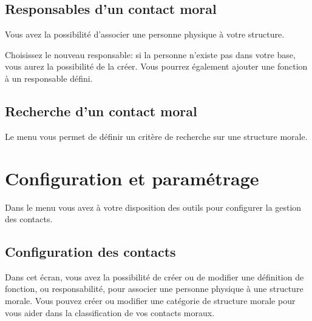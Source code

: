 \documentclass[a4paper,10pt,oneside,french]{sphinxmanual}
\begin{document}
\noindent{}


\subsection{Responsables d’un contact moral}
\label{\detokenize{contacts/legal_entity:responsables-d-un-contact-moral}}
Vous avez la possibilité d’associer une personne physique à votre structure.

Choisissez le nouveau responsable: si la personne n’existe pas dans votre base, vous aurez la possibilité de la créer. Vous pourrez également ajouter une fonction à un responsable défini.

\noindent{}


\subsection{Recherche d’un contact moral}
\label{\detokenize{contacts/legal_entity:recherche-d-un-contact-moral}}
Le menu  vous permet de définir un critère de recherche sur une structure morale.

\noindent{}


\section{Configuration et paramétrage}
\label{\detokenize{contacts/configuration::doc}}\label{\detokenize{contacts/configuration:configuration-et-parametrage}}
Dans le menu  vous avez à votre disposition des outils pour configurer la gestion des contacts.


\subsection{Configuration des contacts}
\label{\detokenize{contacts/configuration:configuration-des-contacts}}
Dans cet écran, vous avez la possibilité de créer ou de modifier une définition de fonction, ou responsabilité, pour associer une personne physique à une structure morale. Vous pouvez créer ou modifier une catégorie de structure morale pour vous aider dans la classification de vos contacts moraux.
\end{document}
